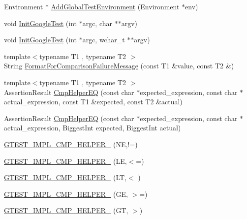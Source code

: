 \begin{DoxyCompactItemize}
\item 
\-Environment $\ast$ \hyperlink{namespacetesting_a3541c13f74a9bfe0a35afe49ec9d76b9}{\-Add\-Global\-Test\-Environment} (\-Environment $\ast$env)
\item 
void \hyperlink{namespacetesting_a2ba4fda7f4d403cbcdf289327009a2da}{\-Init\-Google\-Test} (int $\ast$argc, char $\ast$$\ast$argv)
\item 
void \hyperlink{namespacetesting_a971fc7a1a79f211cb0b830dd28e9dd41}{\-Init\-Google\-Test} (int $\ast$argc, wchar\-\_\-t $\ast$$\ast$argv)
\item 
{\footnotesize template$<$typename T1 , typename T2 $>$ }\\\-String \hyperlink{namespacetesting_1_1internal_af9be1d3d9bbec168d911b750d1d00c5f}{\-Format\-For\-Comparison\-Failure\-Message} (const \-T1 \&value, const \-T2 \&)
\item 
{\footnotesize template$<$typename T1 , typename T2 $>$ }\\\-Assertion\-Result \hyperlink{namespacetesting_1_1internal_aece0b2a63a1af2ace0b3e70dfcb086a5}{\-Cmp\-Helper\-E\-Q} (const char $\ast$expected\-\_\-expression, const char $\ast$actual\-\_\-expression, const \-T1 \&expected, const \-T2 \&actual)
\item 
\-Assertion\-Result \hyperlink{namespacetesting_1_1internal_ab3ac33c050b73adde43e78111448805f}{\-Cmp\-Helper\-E\-Q} (const char $\ast$expected\-\_\-expression, const char $\ast$actual\-\_\-expression, \-Biggest\-Int expected, \-Biggest\-Int actual)
\item 
\hyperlink{namespacetesting_1_1internal_ac8cf80686ba04b6eebb157617c2ca1f7}{\-G\-T\-E\-S\-T\-\_\-\-I\-M\-P\-L\-\_\-\-C\-M\-P\-\_\-\-H\-E\-L\-P\-E\-R\-\_\-} (\-N\-E,!=)
\item 
\hyperlink{namespacetesting_1_1internal_a9fffc421d78a5a07a9c25177f68103a8}{\-G\-T\-E\-S\-T\-\_\-\-I\-M\-P\-L\-\_\-\-C\-M\-P\-\_\-\-H\-E\-L\-P\-E\-R\-\_\-} (\-L\-E,$<$=)
\item 
\hyperlink{namespacetesting_1_1internal_ae8190b68b81ff034772b7aedf296bacc}{\-G\-T\-E\-S\-T\-\_\-\-I\-M\-P\-L\-\_\-\-C\-M\-P\-\_\-\-H\-E\-L\-P\-E\-R\-\_\-} (\-L\-T,$<$ )
\item 
\hyperlink{namespacetesting_1_1internal_abe184c499c47bbe6f9a4eb09ccf575bd}{\-G\-T\-E\-S\-T\-\_\-\-I\-M\-P\-L\-\_\-\-C\-M\-P\-\_\-\-H\-E\-L\-P\-E\-R\-\_\-} (\-G\-E, $>$=)
\item 
\hyperlink{namespacetesting_1_1internal_a7f7c4e81378f80fbc2a7b9ed4d75f48b}{\-G\-T\-E\-S\-T\-\_\-\-I\-M\-P\-L\-\_\-\-C\-M\-P\-\_\-\-H\-E\-L\-P\-E\-R\-\_\-} (\-G\-T, $>$)

\end{DoxyCompactItemize}
